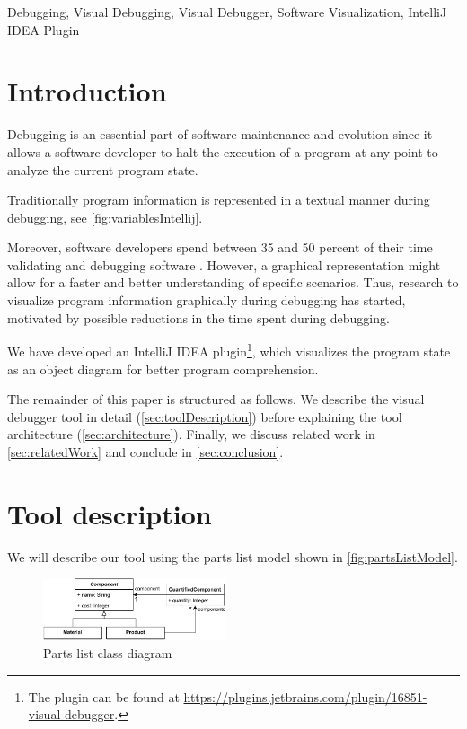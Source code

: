 \documentclass[conference]{IEEEtran}
\newcommand{\intellij}{IntelliJ IDEA}
\begin{document}
\begin{IEEEkeywords}
Debugging, Visual Debugging, Visual Debugger, Software Visualization, IntelliJ IDEA Plugin
\end{IEEEkeywords}

\section{Introduction}
Debugging is an essential part of software maintenance and evolution since it allows a software developer to halt the execution of a program at any point to analyze the current program state.

Traditionally program information is represented in a textual manner during debugging, see \autoref{fig:variablesIntellij}.

Moreover, software developers spend between 35 and 50 percent of their time validating and debugging software \cite{odellDebuggingMindsetUnderstanding2017}.
However, a graphical representation might allow for a faster and better understanding of specific scenarios.
Thus, research to visualize program information graphically during debugging has started, motivated by possible reductions in the time spent during debugging. 

We have developed an \intellij{} plugin\footnote{The plugin can be found at \url{https://plugins.jetbrains.com/plugin/16851-visual-debugger}.}, which visualizes the program state as an object diagram for better program comprehension.

The remainder of this paper is structured as follows.
We describe the visual debugger tool in detail (\autoref{sec:toolDescription}) before explaining the tool architecture (\autoref{sec:architecture}).
Finally, we discuss related work in \autoref{sec:relatedWork} and conclude in \autoref{sec:conclusion}.

\section{Tool description} \label{sec:toolDescription}
We will describe our tool using the parts list model shown in \autoref{fig:partsListModel}.
\begin{figure}[h]
    \centering
    \includegraphics[width=0.48\textwidth]{images/VD-parts list class diagram.pdf}
    \caption{Parts list class diagram}
    \label{fig:partsListModel}
\end{figure}
\end{document}
